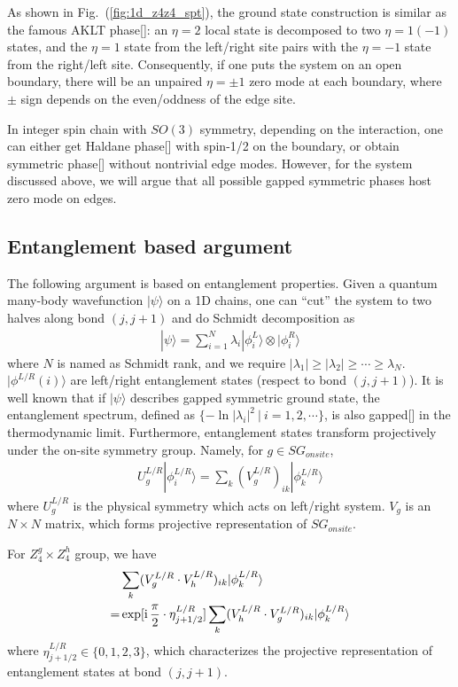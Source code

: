 \documentclass[reprint,amsmath,amssymb,aps,pra,]{revtex4-1}
\newcommand{\ii}{\mathrm{i}\,} %
\begin{document}
As shown in Fig.~(\ref{fig:1d_z4z4_spt}), the ground state construction is similar as the famous AKLT phase[]: an $\eta=2$ local state is decomposed to two $\eta=1(-1)$ states, and the $\eta=1$ state from the left/right site pairs with the $\eta=-1$ state from the right/left site.
Consequently, if one puts the system on an open boundary, there will be an unpaired $\eta=\pm1$ zero mode at each boundary, where $\pm$ sign depends on the even/oddness of the edge site.

In integer spin chain with $SO(3)$ symmetry, depending on the interaction, one can either get Haldane phase[] with spin-1/2 on the boundary, or obtain symmetric phase[] without nontrivial edge modes.
However, for the system discussed above, we will argue that all possible gapped symmetric phases host zero mode on edges.

\subsection{Entanglement based argument}
The following argument is based on entanglement properties.
Given a quantum many-body wavefunction $|\psi\rangle$ on a 1D chains, one can ``cut'' the system to two halves along bond $(j,j+1)$ and do Schmidt decomposition as
\begin{align}
  |\psi\rangle=\sum_{i=1}^N\lambda_i|\phi^L_i\rangle\otimes|\phi^R_i\rangle
  \label{}
\end{align}
where $N$ is named as Schmidt rank, and we require $|\lambda_1|\ge|\lambda_2|\ge\cdots\ge\lambda_N$. 
$|\phi^{L/R}(i)\rangle$ are left/right entanglement states (respect to bond $(j,j+1)$).
It is well known that if $|\psi\rangle$ describes gapped symmetric ground state, the entanglement spectrum, defined as $\{-\ln|\lambda_i|^2\ |\ i=1,2,\cdots\}$, is also gapped[] in the thermodynamic limit.
Furthermore, entanglement states transform projectively under the on-site symmetry group.
Namely, for $g\in SG_{onsite}$, 
\begin{align}
  U_{g}^{L/R}|\phi^{L/R}_i\rangle=\sum_k (V_{g}^{L/R})_{ik}|\phi^{L/R}_k\rangle
  \label{}
\end{align}
where $U_{g}^{L/R}$ is the physical symmetry which acts on left/right system.
$V_g$ is an $N\times N$ matrix, which forms projective representation of $SG_{onsite}$.

For $Z_4^g\times Z_4^h$ group, we have
\begin{align}
  &\sum_{k}(V_{g}^{L/R}\cdot V_h^{L/R})_{ik}|\phi^{L/R}_k\rangle\notag\\
  =&\exp[\ii\frac{\pi}{2}\cdot\eta^{L/R}_{j+1/2}]\sum_{k} (V_h^{L/R}\cdot V_g^{L/R})_{ik}|\phi^{L/R}_k\rangle
  \label{}
\end{align}
where $\eta^{L/R}_{j+1/2}\in\{0,1,2,3\}$, which characterizes the projective representation of entanglement states at bond $(j,j+1)$.
\end{document}
